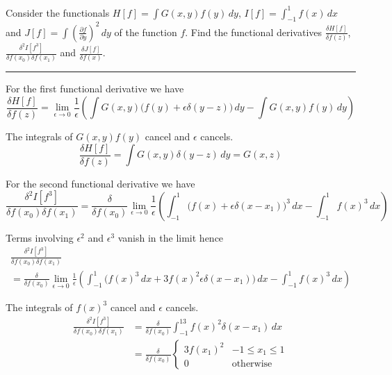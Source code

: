 \documentclass[12pt]{article}
\begin{document}
Consider the functionals
$H[f]=\int G(x,y)f(y)\,dy$,
$I[f]=\int_{-1}^1f(x)\,dx$
and
$J[f]=\int\left(\frac{\partial f}{\partial y}\right)^2\,dy$
of the function $f$.
Find the functional derivatives
$\frac{\delta H[f]}{\delta f(z)}$,
$\frac{\delta^2I[f^3]}{\delta f(x_0)\delta f(x_1)}$
and
$\frac{\delta J[f]}{\delta f(x)}$.

\bigskip
\hrule

\bigskip
For the first functional derivative we have
\begin{equation*}
\frac{\delta H[f]}{\delta f(z)}
=\lim_{\epsilon\rightarrow0}\frac{1}{\epsilon}
\left(
\int G(x,y)\big(f(y)+\epsilon\delta(y-z)\big)\,dy
-\int G(x,y)f(y)\,dy
\right)
\end{equation*}

The integrals of $G(x,y)f(y)$ cancel and $\epsilon$ cancels.
\begin{equation*}
\frac{\delta H[f]}{\delta f(z)}=\int G(x,y)\delta(y-z)\,dy=G(x,z)
\end{equation*}

For the second functional derivative we have
\begin{equation*}
\frac{\delta^2 I[f^3]}{\delta f(x_0)\delta f(x_1)}
=\frac{\delta}{\delta f(x_0)}
\lim_{\epsilon\rightarrow0}\frac{1}{\epsilon}
\left(
\int_{-1}^{1}\big(f(x)+\epsilon\delta(x-x_1)\big)^3\,dx
-\int_{-1}^{1}f(x)^3\,dx
\right)
\end{equation*}

Terms involving $\epsilon^2$ and $\epsilon^3$ vanish in the limit hence
\begin{multline*}
\frac{\delta^2 I[f^3]}{\delta f(x_0)\delta f(x_1)}
\\
=\frac{\delta}{\delta f(x_0)}
\lim_{\epsilon\rightarrow0}\frac{1}{\epsilon}
\left(
\int_{-1}^1\big(f(x)^3\,dx+3f(x)^2\epsilon\delta(x-x_1)\big)\,dx-\int_{-1}^{1}f(x)^3\,dx
\right)
\end{multline*}

The integrals of $f(x)^3$ cancel and $\epsilon$ cancels.
\begin{align*}
\frac{\delta^2 I[f^3]}{\delta f(x_0)\delta f(x_1)}
&=\frac{\delta}{\delta f(x_0)}\int_{-1}^13f(x)^2\delta(x-x_1)\,dx
\\
&=\frac{\delta}{\delta f(x_0)}
\begin{cases}
3f(x_1)^2 & -1\le x_1\le 1
\\
0 & \text{otherwise}
\end{cases}
\tag{1}
\end{align*}
\end{document}
